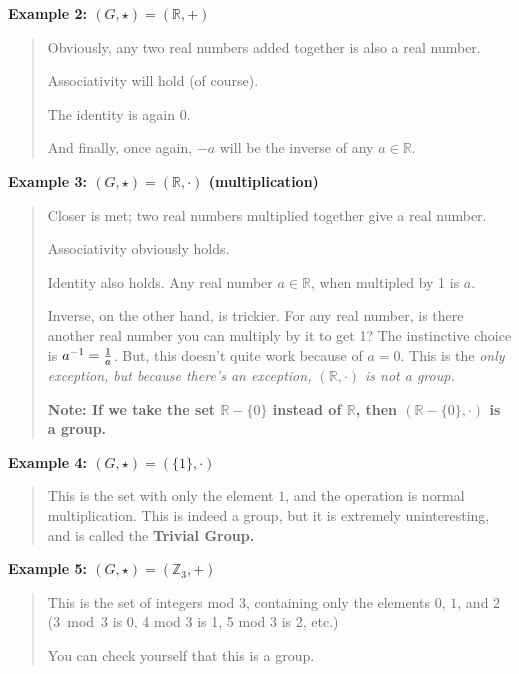 \documentclass[12pt,epsf]{article}
\begin{document}
\bf Example 2: \rm \quad $(G,\star) = (\mathbb{R},+)$
\vspace*{-2ex}
\begin{quote}

Obviously, any two real numbers added together is also a real number.  

Associativity will hold (of course).  

The identity is again 0.  

And finally, once again, $-a$ will be the inverse of any $a \in \mathbb{R}$.  
\end{quote}

\bf Example 3: \rm  \quad $(G,\star) = (\mathbb{R},\cdot)$ (multiplication)
\vspace*{-2ex}
\begin{quote}
Closer is met; two real numbers multiplied together give a real number. 

Associativity obviously holds.	

Identity also holds.  Any real number $a\in \mathbb{R}$, when multipled
by 1 is $a$.	

Inverse, on the other hand, is trickier.  For any real number, is there
another real number you can multiply by it to get 1?	The instinctive
choice is $a^{-1} = {1\over a}$.  But, this doesn't quite work because
of $a=0$.  This is the \it only \rm exception, but because there's an
exception, $(\mathbb{R},\cdot)$ is not a group.  

\bf Note: \rm If we take the set $\mathbb{R} - \{0\}$ instead of
$\mathbb{R}$, then $(\mathbb{R}-\{0\},\cdot)$ is a group.  
\end{quote}

\bf Example 4: \rm \quad $(G,\star) = (\{1\},\cdot)$
\vspace*{-2ex}
\begin{quote}
This is the set with only the element $1$, and the operation is normal
multiplication.  This is indeed a group, but it is extremely
uninteresting, and is called the \bf Trivial Group\rm.	
\end{quote}

\bf Example 5: \rm \quad $(G,\star) = (\mathbb{Z}_3,+)$
\vspace*{-2ex}
\begin{quote}
This is the set of integers mod 3, containing only the elements $0$, $1$,
and $2$ (3~mod~3 is 0, 4 mod 3 is 1, 5 mod 3 is 2, etc.)

You can check yourself that this is a group.  
\end{quote}
\end{document}
